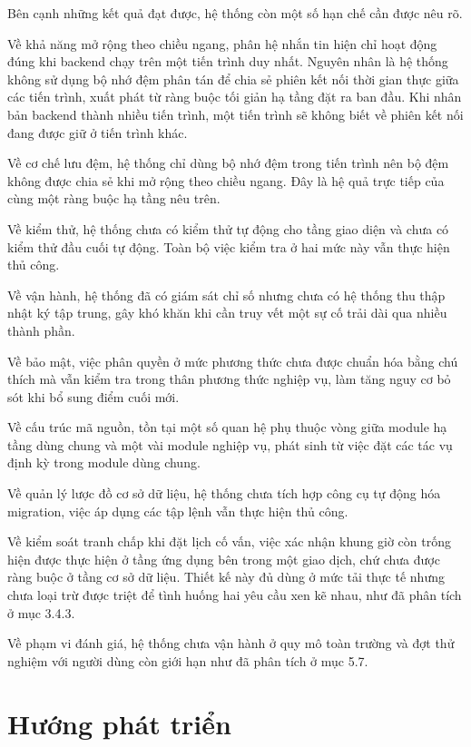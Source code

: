 \documentclass[12pt,a4paper,oneside]{report}
\begin{document}
Bên cạnh những kết quả đạt được, hệ thống còn một số hạn chế cần được nêu rõ.

Về khả năng mở rộng theo chiều ngang, phân hệ nhắn tin hiện chỉ hoạt động đúng khi backend chạy trên một tiến trình duy nhất. Nguyên nhân là hệ thống không sử dụng bộ nhớ đệm phân tán để chia sẻ phiên kết nối thời gian thực giữa các tiến trình, xuất phát từ ràng buộc tối giản hạ tầng đặt ra ban đầu. Khi nhân bản backend thành nhiều tiến trình, một tiến trình sẽ không biết về phiên kết nối đang được giữ ở tiến trình khác.

Về cơ chế lưu đệm, hệ thống chỉ dùng bộ nhớ đệm trong tiến trình nên bộ đệm không được chia sẻ khi mở rộng theo chiều ngang. Đây là hệ quả trực tiếp của cùng một ràng buộc hạ tầng nêu trên.

Về kiểm thử, hệ thống chưa có kiểm thử tự động cho tầng giao diện và chưa có kiểm thử đầu cuối tự động. Toàn bộ việc kiểm tra ở hai mức này vẫn thực hiện thủ công.

Về vận hành, hệ thống đã có giám sát chỉ số nhưng chưa có hệ thống thu thập nhật ký tập trung, gây khó khăn khi cần truy vết một sự cố trải dài qua nhiều thành phần.

Về bảo mật, việc phân quyền ở mức phương thức chưa được chuẩn hóa bằng chú thích mà vẫn kiểm tra trong thân phương thức nghiệp vụ, làm tăng nguy cơ bỏ sót khi bổ sung điểm cuối mới.

Về cấu trúc mã nguồn, tồn tại một số quan hệ phụ thuộc vòng giữa module hạ tầng dùng chung và một vài module nghiệp vụ, phát sinh từ việc đặt các tác vụ định kỳ trong module dùng chung.

Về quản lý lược đồ cơ sở dữ liệu, hệ thống chưa tích hợp công cụ tự động hóa migration, việc áp dụng các tập lệnh vẫn thực hiện thủ công.

Về kiểm soát tranh chấp khi đặt lịch cố vấn, việc xác nhận khung giờ còn trống hiện được thực hiện ở tầng ứng dụng bên trong một giao dịch, chứ chưa được ràng buộc ở tầng cơ sở dữ liệu. Thiết kế này đủ dùng ở mức tải thực tế nhưng chưa loại trừ được triệt để tình huống hai yêu cầu xen kẽ nhau, như đã phân tích ở mục 3.4.3.

Về phạm vi đánh giá, hệ thống chưa vận hành ở quy mô toàn trường và đợt thử nghiệm với người dùng còn giới hạn như đã phân tích ở mục 5.7.

\section{Hướng phát triển}
\end{document}
